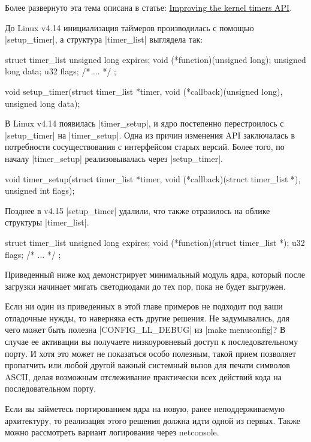 \documentclass[10pt, oneside]{book}
\begin{document}
Более развернуто эта тема описана в статье: \href{https://lwn.net/Articles/735887/}{Improving the kernel timers API}.

До Linux v4.14 инициализация таймеров производилась с помощью \cpp|setup_timer|, а структура \cpp|timer_list| выглядела так:
\begin{code}
struct timer_list {
    unsigned long expires;
    void (*function)(unsigned long);
    unsigned long data;
    u32 flags;
    /* ... */
};

void setup_timer(struct timer_list *timer, void (*callback)(unsigned long),
                 unsigned long data);
\end{code}

В Linux v4.14 появилась \cpp|timer_setup|, и ядро постепенно перестроилось с \cpp|setup_timer| на \cpp|timer_setup|.
Одна из причин изменения API заключалась в потребности сосуществования с интерфейсом старых версий. Более того, по началу \cpp|timer_setup| реализовывалась через \cpp|setup_timer|.

\begin{code}
void timer_setup(struct timer_list *timer,
                 void (*callback)(struct timer_list *), unsigned int flags);
\end{code}

Позднее в v4.15 \cpp|setup_timer| удалили, что также отразилось на облике структуры \cpp|timer_list|.
\begin{code}
struct timer_list {
    unsigned long expires;
    void (*function)(struct timer_list *);
    u32 flags;
    /* ... */
};
\end{code}

Приведенный ниже код демонстрирует минимальный модуль ядра, который после загрузки начинает мигать светодиодами до тех пор, пока не будет выгружен.


Если ни один из приведенных в этой главе примеров не подходит под ваши отладочные нужды, то наверняка есть другие решения. Не задумывались, для чего может быть полезна \cpp|CONFIG_LL_DEBUG| из \sh|make menuconfig|?
В случае ее активации вы получаете низкоуровневый доступ к последовательному порту. И хотя это может не показаться особо полезным, такой прием позволяет пропатчить  или любой другой важный системный вызов для печати символов ASCII, делая возможным отслеживание практически всех действий кода на последовательном порту.

Если вы займетесь портированием ядра на новую, ранее неподдерживаемую архитектуру, то реализация этого решения должна идти одной из первых. Также можно рассмотреть вариант логирования через netconsole.
\end{document}
